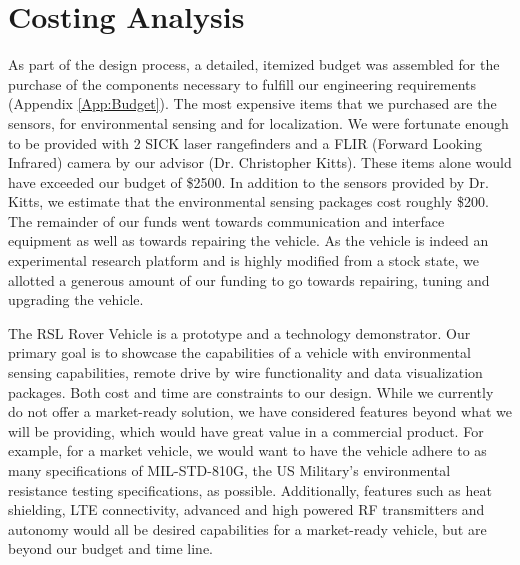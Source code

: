 \chapter{Costing Analysis}

As part of the design process, a detailed, itemized budget was assembled for the purchase of the components necessary to fulfill our engineering requirements (Appendix \ref{App:Budget}). The most expensive items that we purchased are the sensors, for environmental sensing and for localization. We were fortunate enough to be provided with 2 SICK laser rangefinders and a FLIR (Forward Looking Infrared) camera by our advisor (Dr. Christopher Kitts). These items alone would have exceeded our budget of \$2500. In addition to the sensors provided by Dr. Kitts, we estimate that the environmental sensing packages cost roughly \$200. The remainder of our funds went towards communication and interface equipment as well as towards repairing the vehicle. As the vehicle is indeed an experimental research platform and is highly modified from a stock state, we allotted a generous amount of our funding to go towards repairing, tuning and upgrading the vehicle.

The RSL Rover Vehicle is a prototype and a technology demonstrator. Our primary goal is to showcase the capabilities of a vehicle with environmental sensing capabilities, remote drive by wire functionality and data visualization packages. Both cost and time are constraints to our design. While we currently do not offer a market-ready solution, we have considered features beyond what we will be providing, which would have great value in a commercial product. For example, for a market vehicle, we would want to have the vehicle adhere to as many specifications of MIL-STD-810G, the US Military's environmental resistance testing specifications, as possible. Additionally, features such as heat shielding, LTE connectivity, advanced and high powered RF transmitters and autonomy would all be desired capabilities  for a market-ready vehicle, but are beyond our budget and time line.